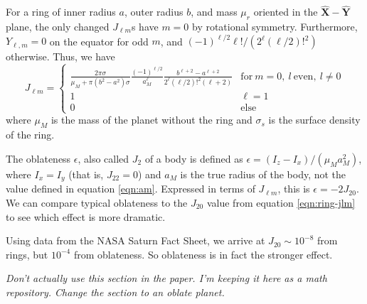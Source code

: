 \documentclass{aastex631}
\newcommand{\unit}[1]{\hat{\bm{#1}}}
\newcommand{\jtd}[1]{{\color{red}\textit{#1}}}
\begin{document}
For a ring of inner radius $a$, outer radius $b$, and mass $\mu_r$ oriented in the $\unit X-\unit Y$ plane, the only changed $J_{\ell m}$s have $m = 0$ by rotational symmetry. Furthermore, $Y_{\ell, m} = 0$ on the equator for odd $m$, and $(-1)^{\ell/2} \ell! / (2^\ell (\ell/2)!^2)$ otherwise. Thus, we have
\begin{equation}
J_{\ell m} = \left\{\begin{array}{cc}
\frac{2 \pi \sigma}{\mu_M + \pi(b^2-a^2)\sigma}\frac{(-1)^{\ell/2}}{a_M^\ell}\frac{b^{\ell+2} - a^{\ell+2}}{2^\ell (\ell/2)!^2 (\ell + 2)}
 & \text{for}\ m = 0,\ l\ \text{even},\ l \neq 0\\
1 & \ell = 1\\
0 & \text{else}
\end{array}\right.
\label{eqn:ring-jlm}
\end{equation}
where $\mu_M$ is the mass of the planet without the ring and $\sigma_s$ is the surface density of the ring.


The oblateness $\epsilon$, also called $J_2$ of a body is defined as $\epsilon = (I_z - I_x)/(\mu_M a_M^2)$, where $I_x = I_y$ (that is, $J_{22} = 0$) and $a_M$ is the true radius of the body, not the value defined in equation \ref{eqn:am}. Expressed in terms of $J_{\ell m}$, this is $\epsilon = -2J_{20}$. We can compare typical oblateness to the $J_{20}$ value from equation \ref{eqn:ring-jlm} to see which effect is more dramatic.

Using data from the NASA Saturn Fact Sheet, we arrive at $J_{20}\sim 10^{-8}$ from rings, but $10^{-4}$ from oblateness. So oblateness is in fact the stronger effect.

\jtd{Don't actually use this section in the paper. I'm keeping it here as a math repository. Change the section to an oblate planet.}
\end{document}
